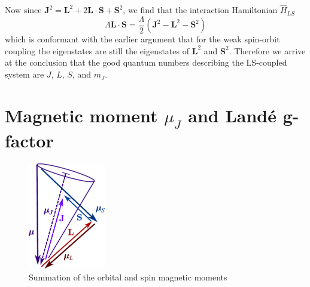 Now since $\mathbf{J}^2 = \mathbf{L}^2 + 2\mathbf{L} \cdot \mathbf{S} + \mathbf{S}^2$, we find that the interaction Hamiltonian $\hat{H}_{LS}$
\begin{equation}
\Lambda \mathbf{L} \cdot \mathbf{S} = \frac{\Lambda}{2}(\mathbf{J}^2-\mathbf{L}^2-\mathbf{S}^2 )
\end{equation}
which is conformant with the earlier argument that for the weak spin-orbit coupling the eigenstates are still the eigenstates of $\mathbf{L}^2$ and $\mathbf{S}^2$. Therefore we arrive at the conclusion that the good quantum numbers describing the LS-coupled system are $J$, $L$, $S$, and $m_J$. 


\section{Magnetic moment $\mu_J$ and Land\'{e} g-factor}

\begin{figure}[ht!]
\centering
\includegraphics[width=0.3\textwidth]{magnetism/figures/mu_J}
\caption{Summation of the orbital and spin magnetic moments\label{fig:mu_J}}
\end{figure}

